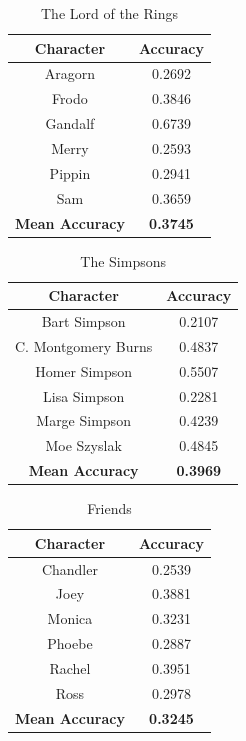 \documentclass{article}
\begin{document}
\begin{titlepage}
\begin{table}[H]
    \centering
    \begin{tabular}{|c|c|}
        \hline
        \textbf{Character} & \textbf{Accuracy} \\
        \hline
        Aragorn & 0.2692 \\
        \hline
        Frodo & 0.3846 \\
        \hline
        Gandalf & 0.6739 \\
        \hline
        Merry & 0.2593 \\
        \hline
        Pippin & 0.2941 \\
        \hline
        Sam & 0.3659 \\
        \hline
        \textbf{Mean Accuracy} & \textbf{0.3745} \\
        \hline
    \end{tabular}
    \caption{The Lord of the Rings}
    \label{tab:lotr_accuracy}
\end{table}

\begin{table}[H]
    \centering
    \begin{tabular}{|c|c|}
        \hline
        \textbf{Character} & \textbf{Accuracy} \\
        \hline
        Bart Simpson & 0.2107 \\
        \hline
        C. Montgomery Burns & 0.4837 \\
        \hline
        Homer Simpson & 0.5507 \\
        \hline
        Lisa Simpson & 0.2281 \\
        \hline
        Marge Simpson & 0.4239 \\
        \hline
        Moe Szyslak & 0.4845 \\
        \hline
        \textbf{Mean Accuracy} & \textbf{0.3969} \\
        \hline
    \end{tabular}
    \caption{The Simpsons}
    \label{tab:simpsons_accuracy}
\end{table}

\begin{table}[H]
    \centering
    \begin{tabular}{|c|c|}
        \hline
        \textbf{Character} & \textbf{Accuracy} \\
        \hline
        Chandler & 0.2539 \\
        \hline
        Joey & 0.3881 \\
        \hline
        Monica & 0.3231 \\
        \hline
        Phoebe & 0.2887 \\
        \hline
        Rachel & 0.3951 \\
        \hline
        Ross & 0.2978 \\
        \hline
        \textbf{Mean Accuracy} & \textbf{0.3245} \\
        \hline
    \end{tabular}
    \caption{Friends}
    \label{tab:friends_accuracy}
\end{table}


\end{titlepage}
\end{document}
